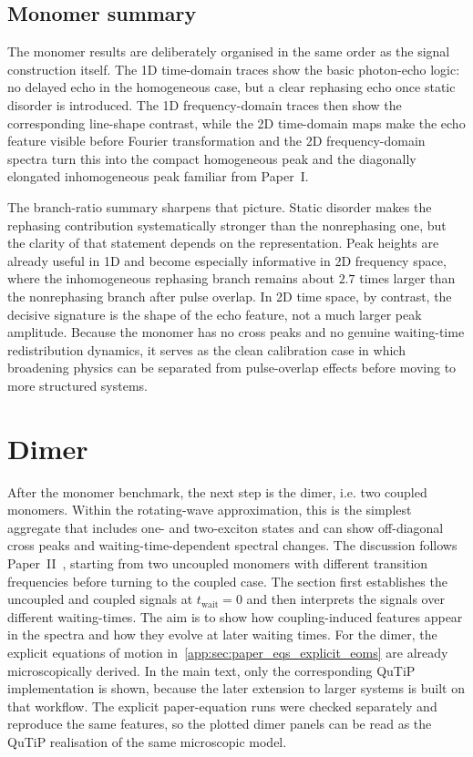 \subsection{Monomer summary}
\label{subsec:results_monomer_summary}

The monomer results are deliberately organised in the same order as the signal construction itself. The 1D time-domain traces show the basic photon-echo logic: no delayed echo in the homogeneous case, but a clear rephasing echo once static disorder is introduced. The 1D frequency-domain traces then show the corresponding line-shape contrast, while the 2D time-domain maps make the echo feature visible before Fourier transformation and the 2D frequency-domain spectra turn this into the compact homogeneous peak and the diagonally elongated inhomogeneous peak familiar from Paper~I.

The branch-ratio summary sharpens that picture. Static disorder makes the rephasing contribution systematically stronger than the nonrephasing one, but the clarity of that statement depends on the representation. Peak heights are already useful in 1D and become especially informative in 2D frequency space, where the inhomogeneous rephasing branch remains about $2.7$ times larger than the nonrephasing branch after pulse overlap. In 2D time space, by contrast, the decisive signature is the shape of the echo feature, not a much larger peak amplitude. Because the monomer has no cross peaks and no genuine waiting-time redistribution dynamics, it serves as the clean calibration case in which broadening physics can be separated from pulse-overlap effects before moving to more structured systems.

\section{Dimer}
\label{sec:results_dimer}

After the monomer benchmark, the next step is the dimer, i.e. two coupled monomers. Within the rotating-wave approximation, this is the simplest aggregate that includes one- and two-exciton states and can show off-diagonal cross peaks and waiting-time-dependent spectral changes. The discussion follows Paper~II~\cite{pisliakovetal2006twodimensionalopticalthreepulse}, starting from two uncoupled monomers with different transition frequencies before turning to the coupled case. The section first establishes the uncoupled and coupled signals at $t_{\mathrm{wait}}=0$ and then interprets the signals over different waiting-times. The aim is to show how coupling-induced features appear in the spectra and how they evolve at later waiting times.
For the dimer, the explicit equations of motion in~\autoref{app:sec:paper_eqs_explicit_eoms} are already microscopically derived. In the main text, only the corresponding QuTiP implementation is shown, because the later extension to larger systems is built on that workflow. The explicit paper-equation runs were checked separately and reproduce the same features, so the plotted dimer panels can be read as the QuTiP realisation of the same microscopic model.


